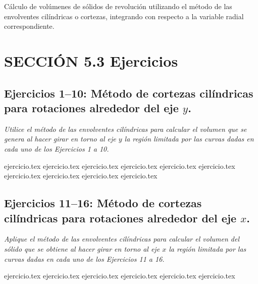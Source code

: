 
Cálculo de volúmenes de sólidos de revolución utilizando el método de las envolventes cilíndricas o cortezas, integrando con respecto a la variable radial correspondiente.

\section*{SECCIÓN 5.3 \quad Ejercicios}

\subsection*{Ejercicios 1--10: Método de cortezas cilíndricas para rotaciones alrededor del eje $y$.}

\noindent \textit{Utilice el método de las envolventes cilíndricas para calcular el volumen que se genera al hacer girar en torno al eje $y$ la región limitada por las curvas dadas en cada uno de los Ejercicios 1 a 10.}

\begin{enumerate}
    {ejercicio.tex}
    {ejercicio.tex}
    {ejercicio.tex}
    {ejercicio.tex}
    {ejercicio.tex}
    {ejercicio.tex}
    {ejercicio.tex}
    {ejercicio.tex}
    {ejercicio.tex}
    {ejercicio.tex}
\end{enumerate}

\subsection*{Ejercicios 11--16: Método de cortezas cilíndricas para rotaciones alrededor del eje $x$.}

\noindent \textit{Aplique el método de las envolventes cilíndricas para calcular el volumen del sólido que se obtiene al hacer girar en torno al eje $x$ la región limitada por las curvas dadas en cada uno de los Ejercicios 11 a 16.}

\begin{enumerate}
    \setcounter{enumi}{10}
    {ejercicio.tex}
    {ejercicio.tex}
    {ejercicio.tex}
    {ejercicio.tex}
    {ejercicio.tex}
    {ejercicio.tex}
\end{enumerate}

